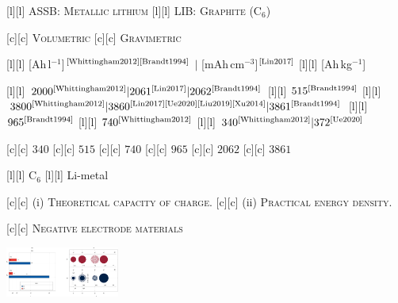 
[l][l] {\tiny ASSB: \textsc{Metallic lithium}}
[l][l] {\tiny LIB: \textsc{Graphite} (C$_{6}$)}

[c][c] {\tiny \textsc{Volumetric}}
[c][c] {\tiny \textsc{Gravimetric}}

[l][l] {\tiny [Ah\,l$^{-1}$]$^{\text{\cite{Whittingham2012}\cite{Brandt1994}}}$ $|$ [mAh\,cm$^{-3}$]$^{\text{\cite{Lin2017}}}$}
[l][l] {\tiny [Ah\,kg$^{-1}$]}

[l][l] {\tiny $2000^{\text{\cite{Whittingham2012}}} | 2061^{\text{\cite{Lin2017}}} | 2062^{\text{\cite{Brandt1994}}}$}
[l][l] {\tiny $515^{\text{\cite{Brandt1994}}}$}
[l][l] {\tiny $3800^{\text{\cite{Whittingham2012}}} | 3860^{\text{\cite{Lin2017}\cite{Ue2020}\cite{Liu2019}\cite{Xu2014}}} | 3861^{\text{\cite{Brandt1994}}}$}
[l][l] {\tiny $965^{\text{\cite{Brandt1994}}}$}
[l][l] {\tiny $740^{\text{\cite{Whittingham2012}}}$}
[l][l] {\tiny $340^{\text{\cite{Whittingham2012}}} | 372^{\text{\cite{Ue2020}}}$}

[c][c] {\tiny $340$}
[c][c] {\tiny $515$}
[c][c] {\tiny $740$}
[c][c] {\tiny $965$}
[c][c] {\tiny $2062$}
[c][c] {\tiny $3861$}

[l][l] {\tiny C$_{6}$}
[l][l] {\tiny \color{black} Li-metal \color{black}}

[c][c]  {\scriptsize (i) \textsc{Theoretical capacity of charge.}}
[c][c] {\scriptsize (ii) \textsc{Practical energy density.}}

[c][c] {\tiny \textsc{Negative electrode materials}}

\includegraphics[width=0.28\textwidth]{energydensity.eps}